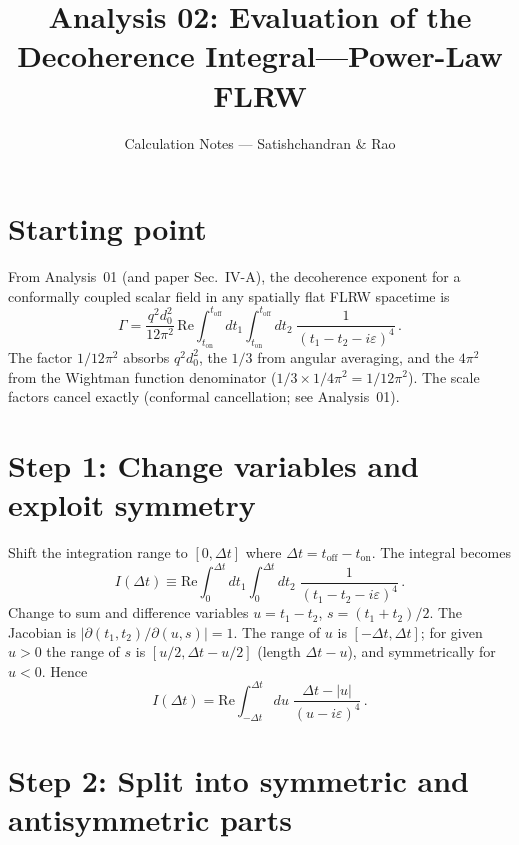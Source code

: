 \documentclass[12pt]{article}
\title{Analysis 02: Evaluation of the Decoherence Integral---Power-Law FLRW}
\author{Calculation Notes --- Satishchandran \& Rao}
\date{}
\begin{document}
\maketitle

\section*{Starting point}

From Analysis~01 (and paper Sec.~IV-A), the decoherence exponent for a
conformally coupled scalar field in any spatially flat FLRW spacetime is
%
\begin{equation}
  \Gamma
  =
  \frac{q^{2}d_{0}^{2}}{12\pi^{2}}
  \,\mathrm{Re}
  \int_{t_{\mathrm{on}}}^{t_{\mathrm{off}}}dt_{1}
  \int_{t_{\mathrm{on}}}^{t_{\mathrm{off}}}dt_{2}\;
  \frac{1}{(t_{1}-t_{2}-i\varepsilon)^{4}} \,.
  \label{eq:Gamma-start}
\end{equation}
%
The factor $1/12\pi^{2}$ absorbs $q^{2}d_{0}^{2}$, the $1/3$ from angular
averaging, and the $4\pi^{2}$ from the Wightman function denominator
($1/3 \times 1/4\pi^{2} = 1/12\pi^{2}$).  The scale factors cancel exactly
(conformal cancellation; see Analysis~01).

\section*{Step 1: Change variables and exploit symmetry}

Shift the integration range to $[0,\Delta t]$ where $\Delta t = t_{\mathrm{off}}-t_{\mathrm{on}}$.
The integral becomes
%
\begin{equation}
  I(\Delta t)
  \equiv
  \mathrm{Re}\int_{0}^{\Delta t}dt_{1}\int_{0}^{\Delta t}dt_{2}\;
  \frac{1}{(t_{1}-t_{2}-i\varepsilon)^{4}} \,.
  \label{eq:I-def}
\end{equation}
%
Change to sum and difference variables $u = t_{1}-t_{2}$, $s=(t_1+t_2)/2$.
The Jacobian is $|{\partial(t_1,t_2)/\partial(u,s)}|=1$.
The range of $u$ is $[-\Delta t, \Delta t]$; for given $u>0$ the range of
$s$ is $[u/2, \Delta t - u/2]$ (length $\Delta t - u$), and symmetrically for $u<0$.
Hence
%
\begin{equation}
  I(\Delta t)
  =
  \mathrm{Re}\int_{-\Delta t}^{\Delta t}du\;
  \frac{\Delta t - |u|}{(u-i\varepsilon)^{4}} \,.
  \label{eq:I-uform}
\end{equation}

\section*{Step 2: Split into symmetric and antisymmetric parts}
\end{document}
